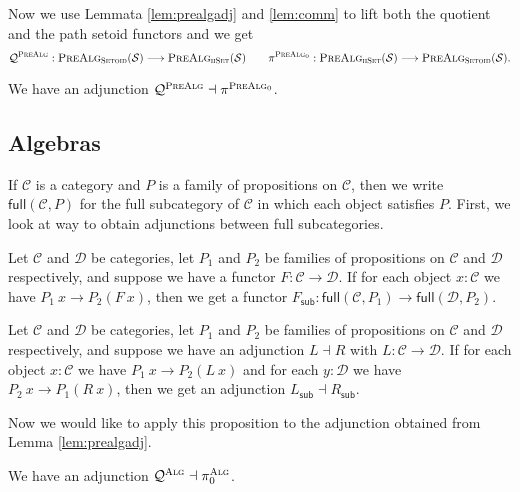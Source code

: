 \documentclass[9pt]{entcs}
\newcommand{\type}[1]{\textsc{#1}}
\newcommand{\category}[1]{\textsc{#1}}
\newcommand{\function}[1]{\mathsf{#1}}
\newcommand{\hset}{\type{hSet}} %
\newcommand{\0}{\textbf{0}} %
\newcommand{\1}{\textbf{1}} %
\newcommand{\setoids}{\category{Setoid}} %
\newcommand{\functor}[2]{#1 \longrightarrow #2} %
\newcommand{\adj}[2]{#1 \dashv #2} %
\newcommand{\fullsub}[2]{\function{full}(#1,#2)} %
\newcommand{\factorsub}[1]{#1_{\function{sub}}} %
\newcommand{\sig}{\mathcal{S}} %
\newcommand{\prealg}[1]{\category{PreAlg}_{\hset}(#1)} %
\newcommand{\prealgst}[1]{\category{PreAlg}_{\setoids}(#1)} %
\newcommand{\quotPA}{\mathcal{Q}^{\category{PreAlg}}}
\newcommand{\pathPA}{\pi^{\category{PreAlg}_0}}
\newcommand{\quotAA}{\mathcal{Q}^{\category{Alg}}}
\newcommand{\pathAA}{\pi_0^{\category{Alg}}}
\begin{document}
Now we use Lemmata \ref{lem:prealgadj} and \ref{lem:comm} to lift both the quotient and the path setoid functors and we get
\[
\quotPA : \functor{\prealgst{\sig}}{\prealg{\sig}}
\quad \quad
\pathPA : \functor{\prealg{\sig}}{\prealgst{\sig}}.
\]



\begin{lemma}
We have an adjunction $\adj{\quotPA}{\pathPA}$.
\end{lemma}

\subsection{Algebras}

If $\mathcal{C}$ is a category and $P$ is a family of propositions on $\mathcal{C}$, then we write $\fullsub{\mathcal{C}}{P}$ for the full subcategory of $\mathcal{C}$ in which each object satisfies $P$.
First, we look at way to obtain adjunctions between full subcategories.

\begin{lemma}
Let $\mathcal{C}$ and $\mathcal{D}$ be categories, let $P_1$ and $P_2$ be families of propositions on $\mathcal{C}$ and $\mathcal{D}$ respectively, and suppose we have a functor $F : \functor{\mathcal{C}}{\mathcal{D}}$.
If for each object $x : \mathcal{C}$ we have $P_1 \> x \rightarrow P_2(F \> x)$, then we get a functor $\factorsub{F} : \functor{\fullsub{\mathcal{C}}{P_1}}{\fullsub{\mathcal{D}}{P_2}}$.
\end{lemma}

\begin{proposition}
Let $\mathcal{C}$ and $\mathcal{D}$ be categories, let $P_1$ and $P_2$ be families of propositions on $\mathcal{C}$ and $\mathcal{D}$ respectively, and suppose we have an adjunction $\adj{L}{R}$ with $L : \functor{\mathcal{C}}{\mathcal{D}}$.
If for each object $x : \mathcal{C}$ we have $P_1 \> x \rightarrow P_2(L \> x)$ and for each $y : \mathcal{D}$ we have $P_2 \> x \rightarrow P_1(R \> x)$, then we get an adjunction $\adj{\factorsub{L}}{\factorsub{R}}$.
\end{proposition}

Now we would like to apply this proposition to the adjunction obtained from Lemma \ref{lem:prealgadj}.


\begin{theorem}
\label{thm:algadj}
We have an adjunction $\adj{\quotAA}{\pathAA}$.
\end{theorem}
\end{document}

